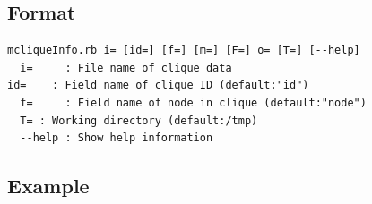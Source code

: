 \subsection{Format}
\begin{verbatim}
mcliqueInfo.rb i= [id=] [f=] [m=] [F=] o= [T=] [--help]
  i=     : File name of clique data
id=    : Field name of clique ID (default:"id") 
  f=     : Field name of node in clique (default:"node") 
  T= : Working directory (default:/tmp)
  --help : Show help information
\end{verbatim}

\subsection{Example}



